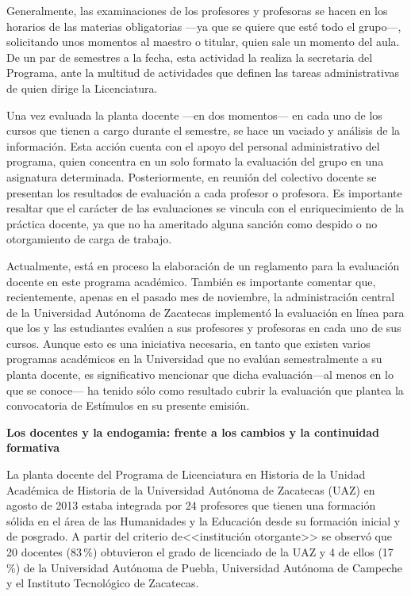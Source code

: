 {\enlargethispage{1\baselineskip} 
Generalmente, las examinaciones de los profesores y profesoras se hacen en
los horarios de las materias obligatorias ---ya que se quiere que esté todo
el grupo---, solicitando unos momentos al maestro o titular, quien sale un
momento del aula. De un par de semestres a la fecha, esta
actividad la realiza la secretaria del Programa, ante la multitud de
actividades que definen las tareas administrativas de quien dirige la
Licenciatura.


Una vez evaluada la planta docente ---en dos momentos--- en cada uno de los
cursos que tienen a cargo durante el semestre, se hace un vaciado y
análisis de la información. Esta acción cuenta con el apoyo del personal
administrativo del programa, quien concentra en un solo formato la
evaluación del grupo en una asignatura determinada. Posteriormente, en
reunión del colectivo docente se presentan los resultados de evaluación a
cada profesor o profesora. Es importante resaltar que el carácter de las
evaluaciones se vincula con el enriquecimiento de la práctica docente, ya
que no ha ameritado alguna sanción como despido o no otorgamiento de carga
de trabajo. 


Actualmente, está en proceso la elaboración de un reglamento para la
evaluación docente en este programa académico. También es importante
comentar que, recientemente, apenas en el pasado mes de noviembre, la
administración central de la Universidad Autónoma de Zacatecas implementó
la evaluación en línea para que los y las estudiantes evalúen a sus
profesores y profesoras en cada uno de sus cursos. Aunque esto es una
iniciativa necesaria, en tanto que existen varios programas académicos en
la Universidad que no evalúan semestralmente a su planta docente, es
significativo mencionar que dicha evaluación\linebreak ---al menos en lo que se conoce---
ha tenido sólo como resultado cubrir la evaluación que plantea la
convocatoria de Estímulos en su presente emisión.


\bigskip 
\textbf{Los docentes y la  endogamia: frente a los cambios y la
continuidad  formativa}

La planta docente del Programa de Licenciatura en Historia de la Unidad
Académica de Historia de la Universidad Autónoma de Zacatecas (UAZ) en
agosto de 2013 estaba integrada por 24 profesores que tienen una formación
sólida en el área de las Humanidades y la Educación desde su formación
inicial y de posgrado. A partir del criterio de\linebreak <<institución otorgante>> se
observó que  20 docentes (83\,\%) obtuvieron el grado de licenciado de la UAZ
y 4 de ellos (17\,\%) de la Universidad Autónoma de Puebla, Universidad
Autónoma de Campeche y el Instituto Tecnológico de Zacatecas. 

}
